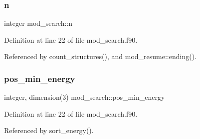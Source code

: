 \subsubsection{\texorpdfstring{n}{n}}
{\footnotesize\ttfamily integer mod\+\_\+search\+::n}



Definition at line 22 of file mod\+\_\+search.\+f90.



Referenced by count\+\_\+structures(), and mod\+\_\+resume\+::ending().

\mbox{\label{namespacemod__search_a018a3c64ea9e25b0dfc15ebe763920cf}} 
\subsubsection{\texorpdfstring{pos\+\_\+min\+\_\+energy}{pos\_min\_energy}}
{\footnotesize\ttfamily integer, dimension(3) mod\+\_\+search\+::pos\+\_\+min\+\_\+energy}



Definition at line 22 of file mod\+\_\+search.\+f90.



Referenced by sort\+\_\+energy().

